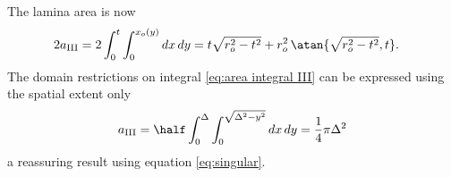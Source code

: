 %
The lamina area is now
%
\begin{equation}
  \begin{split}
    2a_{\mathrm{III}}=2 \int_{0}^{t} \int_{0}^{x_{o}(y)} dx \, dy
      &= t \sqrt{r_{o}^{2} - t^{2}} + r_{o}^{2} \, \atan{ \sqrt{r_{o}^{2} - t^{2}}, t }.
  \end{split}
  \label{eq:area integral III}
\end{equation}
%
The domain restrictions on integral \eqref{eq:area integral III} can be expressed using the spatial extent only
%
\begin{equation}
  \begin{split}
    a_{\mathrm{III}}= \half \int_{0}^{\Delta} \int_{0}^{\sqrt{\Delta^{2} - y^{2}}} dx \, dy
      = \frac{1}{4} \pi \Delta^{2}
  \end{split}
  \label{eq:area integral III}
\end{equation}
a reassuring result using equation \eqref{eq:singular}.
%

